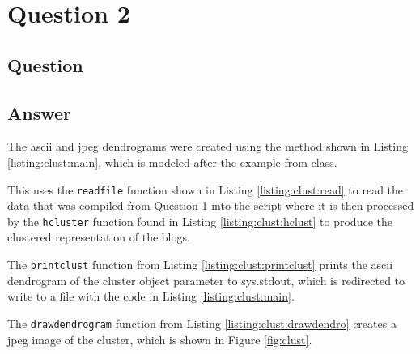 \section{Question 2}

\subsection{Question}


\subsection{Answer}
The ascii and jpeg dendrograms were created using the method shown in Listing \ref{listing:clust:main}, which is modeled after the example from class. 



This uses the {\tt readfile} function shown in Listing \ref{listing:clust:read} to read the data that was compiled from Question 1 into the script where it is then processed by the {\tt hcluster} function found in Listing \ref{listing:clust:hclust} to produce the clustered representation of the blogs.





The {\tt printclust} function from Listing \ref{listing:clust:printclust} prints the ascii dendrogram of the cluster object parameter to sys.stdout, which is redirected to write to a file with the code in Listing \ref{listing:clust:main}.



The {\tt drawdendrogram} function from Listing \ref{listing:clust:drawdendro} creates a jpeg image of the cluster, which is shown in Figure \ref{fig:clust}.



